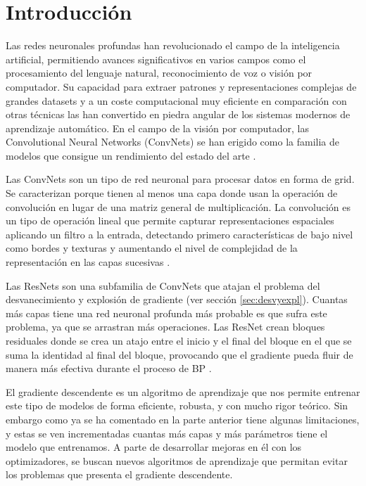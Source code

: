 \section{Introducción}

Las redes neuronales profundas han revolucionado el campo de la inteligencia artificial, permitiendo avances significativos en varios campos como el procesamiento del lenguaje natural, reconocimiento de voz o visión por computador. Su capacidad para extraer patrones y representaciones complejas de grandes datasets y a un coste computacional muy eficiente en comparación con otras técnicas las han convertido en piedra angular de los sistemas modernos de aprendizaje automático. En el campo de la visión por computador, las Convolutional Neural Networks (ConvNets) se han erigido como la familia de modelos que consigue un rendimiento del estado del arte \cite{GoodFellowBook}.

Las ConvNets son un tipo de red neuronal para procesar datos en forma de grid. Se caracterizan porque tienen al menos una capa donde usan la operación de convolución en lugar de una matriz general de multiplicación. La convolución es un tipo de operación lineal que permite capturar representaciones espaciales aplicando un filtro a la entrada, detectando primero características de bajo nivel como bordes y texturas y aumentando el nivel de complejidad de la representación en las capas sucesivas \cite{GoodFellowBook}.

Las ResNets son una subfamilia de ConvNets que atajan el problema del desvanecimiento y explosión de gradiente (ver sección \ref{sec:desvyexpl}). Cuantas más capas tiene una red neuronal profunda más probable es que sufra este problema, ya que se arrastran más operaciones. Las ResNet crean bloques residuales donde se crea un atajo entre el inicio y el final del bloque en el que se suma la identidad al final del bloque, provocando que el gradiente pueda fluir de manera más efectiva durante el proceso de BP \cite{ResNets}.

El gradiente descendente es un algoritmo de aprendizaje que nos permite entrenar este tipo de modelos de forma eficiente, robusta, y con mucho rigor teórico. Sin embargo como ya se ha comentado en la parte anterior tiene algunas limitaciones, y estas se ven incrementadas cuantas más capas y más parámetros tiene el modelo que entrenamos. A parte de desarrollar mejoras en él con los optimizadores, se buscan nuevos algoritmos de aprendizaje que permitan evitar los problemas que presenta el gradiente descendente.

